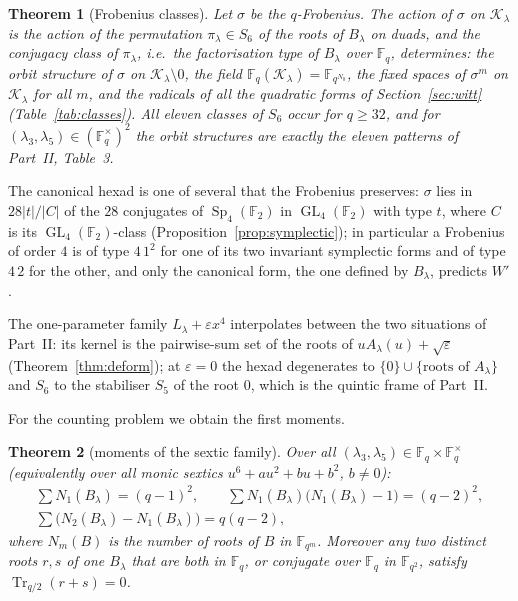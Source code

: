 ﻿\documentclass[12pt,a4paper]{amsart}
\newtheorem{theorem}{Theorem}[section]
\theoremstyle{definition}
\newcommand{\F}{\mathbb{F}}
\newcommand{\Tr}{\operatorname{Tr}}
\newcommand{\Sp}{\operatorname{Sp}}
\newcommand{\GL}{\operatorname{GL}}
\newcommand{\eps}{\varepsilon}
\newcommand{\Kk}{\mathcal{K}}
\begin{document}
\begin{theorem}[Frobenius classes]\label{thm:classes}
Let $\sigma$ be the $q$-Frobenius. The action of $\sigma$ on $\Kk_\lambda$ is the action of the permutation $\pi_\lambda\in S_6$ of the roots of $B_\lambda$ on duads, and the conjugacy class of $\pi_\lambda$, i.e.\ the factorisation type of $B_\lambda$ over $\F_q$, determines: the orbit structure of $\sigma$ on $\Kk_\lambda\setminus0$, the field $\F_q(\Kk_\lambda)=\F_{q^{N_0}}$, the fixed spaces of $\sigma^m$ on $\Kk_\lambda$ for all $m$, and the radicals of all the quadratic forms of Section~\ref{sec:witt} (Table~\ref{tab:classes}). All eleven classes of $S_6$ occur for $q\ge32$, and for $(\lambda_3,\lambda_5)\in(\F_q^\times)^2$ the orbit structures are exactly the eleven patterns of Part~II, Table~3.
\end{theorem}

The canonical hexad is one of several that the Frobenius preserves: $\sigma$ lies in $28|t|/|C|$ of the $28$ conjugates of $\Sp_4(\F_2)$ in $\GL_4(\F_2)$ with type $t$, where $C$ is its $\GL_4(\F_2)$-class (Proposition~\ref{prop:symplectic}); in particular a Frobenius of order $4$ is of type $4\,1^2$ for one of its two invariant symplectic forms and of type $4\,2$ for the other, and only the canonical form, the one defined by $B_\lambda$, predicts $W'$.

The one-parameter family $L_\lambda+\eps x^4$ interpolates between the two situations of Part~II: its kernel is the pairwise-sum set of the roots of $uA_\lambda(u)+\sqrt\eps$ (Theorem~\ref{thm:deform}); at $\eps=0$ the hexad degenerates to $\{0\}\cup\{\text{roots of }A_\lambda\}$ and $S_6$ to the stabiliser $S_5$ of the root $0$, which is the quintic frame of Part~II.

For the counting problem we obtain the first moments.

\begin{theorem}[moments of the sextic family]\label{thm:moments}
Over all $(\lambda_3,\lambda_5)\in\F_q\times\F_q^\times$ (equivalently over all monic sextics $u^6+au^2+bu+b^2$, $b\ne0$):
\begin{gather*}
\sum N_1(B_\lambda)=(q-1)^2,\qquad \sum N_1(B_\lambda)\bigl(N_1(B_\lambda)-1\bigr)=(q-2)^2,\\
\sum\bigl(N_2(B_\lambda)-N_1(B_\lambda)\bigr)=q(q-2),
\end{gather*}
where $N_m(B)$ is the number of roots of $B$ in $\F_{q^m}$. Moreover any two distinct roots $r,s$ of one $B_\lambda$ that are both in $\F_q$, or conjugate over $\F_q$ in $\F_{q^2}$, satisfy $\Tr_{q/2}(r+s)=0$.
\end{theorem}
\end{document}
